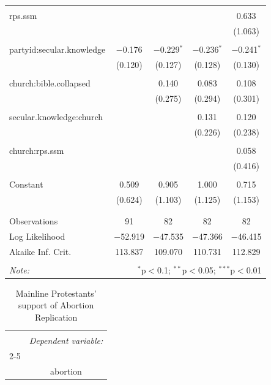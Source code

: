 \documentclass[12pt,letterpaper]{article}
\begin{document}
\begin{description}
\begin{table}[H]
\begin{tabular}{@{\extracolsep{5pt}}lcccc}
		& & & & \\ 
		rps.ssm &  &  &  & 0.633 \\ 
		&  &  &  & (1.063) \\ 
		& & & & \\ 
		partyid:secular.knowledge & $-$0.176 & $-$0.229$^{*}$ & $-$0.236$^{*}$ & $-$0.241$^{*}$ \\ 
		& (0.120) & (0.127) & (0.128) & (0.130) \\ 
		& & & & \\ 
		church:bible.collapsed &  & 0.140 & 0.083 & 0.108 \\ 
		&  & (0.275) & (0.294) & (0.301) \\ 
		& & & & \\ 
		secular.knowledge:church &  &  & 0.131 & 0.120 \\ 
		&  &  & (0.226) & (0.238) \\ 
		& & & & \\ 
		church:rps.ssm &  &  &  & 0.058 \\ 
		&  &  &  & (0.416) \\ 
		& & & & \\ 
		Constant & 0.509 & 0.905 & 1.000 & 0.715 \\ 
		& (0.624) & (1.103) & (1.125) & (1.153) \\ 
		& & & & \\ 
		\hline \\[-1.8ex] 
		Observations & 91 & 82 & 82 & 82 \\ 
		Log Likelihood & $-$52.919 & $-$47.535 & $-$47.366 & $-$46.415 \\ 
		Akaike Inf. Crit. & 113.837 & 109.070 & 110.731 & 112.829 \\ 
		\hline 
		\hline \\[-1.8ex] 
		\textit{Note:}  & \multicolumn{4}{r}{$^{*}$p$<$0.1; $^{**}$p$<$0.05; $^{***}$p$<$0.01} \\ 
	\end{tabular} 
\end{table} 
\begin{table}[H] \centering 
	\caption{Mainline Protestants' support of Abortion Replication} 
	\label{} 
	\scriptsize 
	\begin{tabular}{@{\extracolsep{5pt}}lcccc} 
		\\[-1.8ex]\hline 
		\hline \\[-1.8ex] 
		& \multicolumn{4}{c}{\textit{Dependent variable:}} \\ 
		\cline{2-5} 
		\\[-1.8ex] & \multicolumn{4}{c}{abortion} \\ 

\end{tabular}
\end{table}
\end{description}
\end{document}
